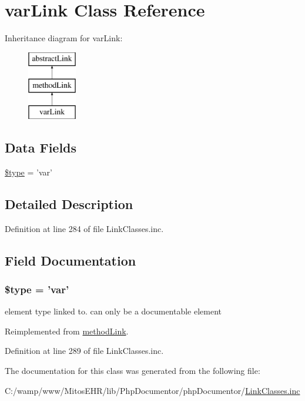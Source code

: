 \hypertarget{classvar_link}{\section{var\-Link \-Class \-Reference}
\label{classvar_link}
}
\-Inheritance diagram for var\-Link\-:\begin{figure}[H]
\begin{center}
\leavevmode
\includegraphics[height=3.000000cm]{classvar_link}
\end{center}
\end{figure}
\subsection*{\-Data \-Fields}
\begin{DoxyCompactItemize}
\item 
\hyperlink{classvar_link_a9a4a6fba2208984cabb3afacadf33919}{\$type} = 'var'
\end{DoxyCompactItemize}


\subsection{\-Detailed \-Description}


\-Definition at line 284 of file \-Link\-Classes.\-inc.



\subsection{\-Field \-Documentation}
\hypertarget{classvar_link_a9a4a6fba2208984cabb3afacadf33919}{
\subsubsection[{\$type}]{\setlength{\rightskip}{0pt plus 5cm}\$type = 'var'}}\label{classvar_link_a9a4a6fba2208984cabb3afacadf33919}
element type linked to. can only be a documentable element 

\-Reimplemented from \hyperlink{classmethod_link_a9a4a6fba2208984cabb3afacadf33919}{method\-Link}.



\-Definition at line 289 of file \-Link\-Classes.\-inc.



\-The documentation for this class was generated from the following file\-:\begin{DoxyCompactItemize}
\item 
\-C\-:/wamp/www/\-Mitos\-E\-H\-R/lib/\-Php\-Documentor/php\-Documentor/\hyperlink{_link_classes_8inc}{\-Link\-Classes.\-inc}\end{DoxyCompactItemize}
